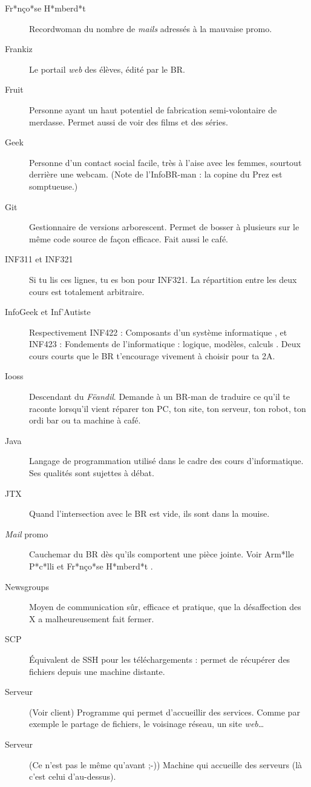 \begin{description}
  \item[Fr*nço*se H*mberd*t] Recordwoman du nombre de \emph{mails} adressés à la mauvaise promo.
  \item[Frankiz] Le portail \emph{web} des élèves, édité par le BR.
  \item[Fruit] Personne ayant un haut potentiel de fabrication semi-volontaire de merdasse. Permet aussi de voir des films et des séries.
  \item[Geek] Personne d'un contact social facile, très à l'aise avec les femmes, sourtout derrière une webcam. (Note de l'InfoBR-man : la copine du Prez est somptueuse.)
  \item[Git] Gestionnaire de versions arborescent. Permet de bosser à plusieurs sur le même code source de façon efficace. Fait aussi le café.
  \item[INF311 et INF321] Si tu lis ces lignes, tu es bon pour INF321. La répartition entre les deux cours est totalement arbitraire.
  \item[InfoGeek et Inf'Autiste] Respectivement INF422 : \og Composants d'un système informatique \fg, et INF423 : \og Fondements de l'informatique : logique, modèles, calculs \fg.
Deux cours courts que le BR t'encourage vivement à choisir pour ta 2A.
  \item[Iooss] Descendant du \emph{Fëandil}. Demande à un BR-man de traduire ce qu'il te raconte lorsqu'il vient réparer ton PC, ton site, ton serveur, ton robot, ton ordi bar ou
ta machine à café.
  \item[Java] Langage de programmation utilisé dans le cadre des cours d'informatique. Ses qualités sont sujettes à débat.
  \item[JTX] Quand l'intersection avec le BR est vide, ils sont dans la mouise.
  \item[\emph{Mail} promo] Cauchemar du BR dès qu'ils comportent une pièce jointe. Voir \og Arm*lle P*c*lli \fg et \og Fr*nço*se H*mberd*t \fg.
  \item[Newsgroups] Moyen de communication sûr, efficace et pratique, que la désaffection des X a malheureusement fait fermer.
  \item[SCP] \'Equivalent de SSH pour les téléchargements : permet de récupérer des fichiers depuis une machine distante.
  \item[Serveur] (Voir client) Programme qui permet d'accueillir des services. Comme par exemple le partage de fichiers, le voisinage réseau, un site \emph{web}\ldots\
  \item[Serveur] (Ce n'est pas le même qu'avant ;-)) Machine qui accueille des serveurs (là c'est celui d'au-dessus).

\end{description}

